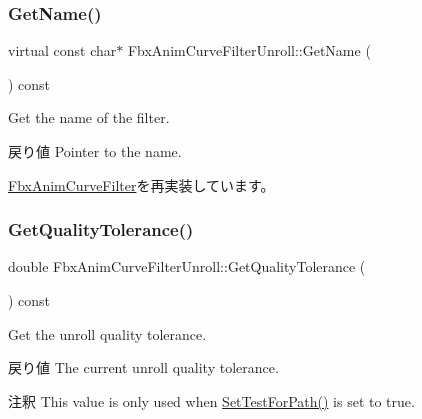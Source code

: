 \subsubsection{\texorpdfstring{Get\+Name()}{GetName()}}
{\footnotesize\ttfamily virtual const char$\ast$ Fbx\+Anim\+Curve\+Filter\+Unroll\+::\+Get\+Name (\begin{DoxyParamCaption}{ }\end{DoxyParamCaption}) const\hspace{0.3cm}{\ttfamily [virtual]}}

Get the name of the filter. \begin{DoxyReturn}{戻り値}
Pointer to the name. 
\end{DoxyReturn}


\hyperlink{class_fbx_anim_curve_filter_abd559d5052fbb072042e59241940a35c}{Fbx\+Anim\+Curve\+Filter}を再実装しています。

\mbox{\label{class_fbx_anim_curve_filter_unroll_a881a4c7122073deec59ab208b2bdf95a}} 
\subsubsection{\texorpdfstring{Get\+Quality\+Tolerance()}{GetQualityTolerance()}}
{\footnotesize\ttfamily double Fbx\+Anim\+Curve\+Filter\+Unroll\+::\+Get\+Quality\+Tolerance (\begin{DoxyParamCaption}{ }\end{DoxyParamCaption}) const}

Get the unroll quality tolerance. \begin{DoxyReturn}{戻り値}
The current unroll quality tolerance. 
\end{DoxyReturn}
\begin{DoxyRemark}{注釈}
This value is only used when \hyperlink{class_fbx_anim_curve_filter_unroll_af87dabf0628d09c9864ed445f11f8c66}{Set\+Test\+For\+Path()} is set to true. 
\end{DoxyRemark}
\mbox{\label{class_fbx_anim_curve_filter_unroll_af073ba1c941aca18f6ba62a811bf8a02}} 
